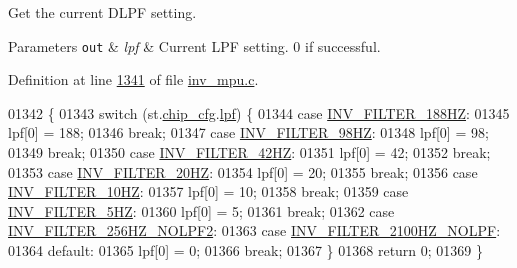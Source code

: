 Get the current D\+L\+PF setting. 


\begin{DoxyParams}[1]{Parameters}
\mbox{\tt out}  & {\em lpf} & Current L\+PF setting. 0 if successful. \\
\hline
\end{DoxyParams}


Definition at line \hyperlink{inv__mpu_8c_source_l01341}{1341} of file \hyperlink{inv__mpu_8c_source}{inv\+\_\+mpu.\+c}.


\begin{DoxyCode}
01342 \{
01343     \textcolor{keywordflow}{switch} (st.\hyperlink{structgyro__state__s_ac895217592e2084bd520b0be8e9d20ee}{chip\_cfg}.\hyperlink{structchip__cfg__s_a0a4067140c6a3704b4312ba62b77aadb}{lpf}) \{
01344     \textcolor{keywordflow}{case} \hyperlink{inv__mpu_8c_a91c762a5bd71461f7911dc49ee7696e9ab58e52e0b6be4cbaf0c7f32705a9fcec}{INV\_FILTER\_188HZ}:
01345         lpf[0] = 188;
01346         \textcolor{keywordflow}{break};
01347     \textcolor{keywordflow}{case} \hyperlink{inv__mpu_8c_a91c762a5bd71461f7911dc49ee7696e9a0f288da0c97b325a6cb57f1223f0cf98}{INV\_FILTER\_98HZ}:
01348         lpf[0] = 98;
01349         \textcolor{keywordflow}{break};
01350     \textcolor{keywordflow}{case} \hyperlink{inv__mpu_8c_a91c762a5bd71461f7911dc49ee7696e9a995b18a52a5bd919aa9c1411a2292110}{INV\_FILTER\_42HZ}:
01351         lpf[0] = 42;
01352         \textcolor{keywordflow}{break};
01353     \textcolor{keywordflow}{case} \hyperlink{inv__mpu_8c_a91c762a5bd71461f7911dc49ee7696e9aebecb86604e475ed8e2cb68340010ff1}{INV\_FILTER\_20HZ}:
01354         lpf[0] = 20;
01355         \textcolor{keywordflow}{break};
01356     \textcolor{keywordflow}{case} \hyperlink{inv__mpu_8c_a91c762a5bd71461f7911dc49ee7696e9a327619f406c6b2f6a221793881013508}{INV\_FILTER\_10HZ}:
01357         lpf[0] = 10;
01358         \textcolor{keywordflow}{break};
01359     \textcolor{keywordflow}{case} \hyperlink{inv__mpu_8c_a91c762a5bd71461f7911dc49ee7696e9abdaaf85666fd6a490ee01dcd8a315678}{INV\_FILTER\_5HZ}:
01360         lpf[0] = 5;
01361         \textcolor{keywordflow}{break};
01362     \textcolor{keywordflow}{case} \hyperlink{inv__mpu_8c_a91c762a5bd71461f7911dc49ee7696e9a9f0263fbbdccd3c5a18fcb65be278d24}{INV\_FILTER\_256HZ\_NOLPF2}:
01363     \textcolor{keywordflow}{case} \hyperlink{inv__mpu_8c_a91c762a5bd71461f7911dc49ee7696e9a76de97a6c2f8eb3c5d1a73d717513f5d}{INV\_FILTER\_2100HZ\_NOLPF}:
01364     \textcolor{keywordflow}{default}:
01365         lpf[0] = 0;
01366         \textcolor{keywordflow}{break};
01367     \}
01368     \textcolor{keywordflow}{return} 0;
01369 \}
\end{DoxyCode}

